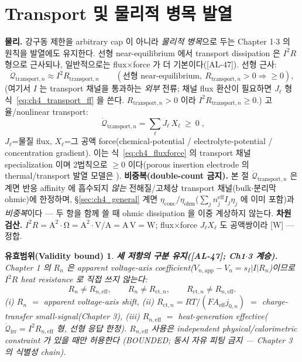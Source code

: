 \documentclass[11pt,a4paper]{article}
\newtheorem*{boundbox}{유효범위(Validity bound)}
\newcommand{\eff}{\mathrm{eff}}
\newcommand{\app}{\mathrm{app}}
\newcommand{\irr}{\mathrm{irr}}
\newcommand{\ct}{\mathrm{ct}}
\newcommand{\ohm}{\mathrm{ohm}}
\newcommand{\conc}{\mathrm{conc}}
\newcommand{\transp}{\mathrm{transport}}
\newcommand{\AL}[1]{\textsf{[AL-#1]}}
\begin{document}
\section{Transport 및 물리적 병목 발열}\label{sec:ch4_transport}
\textbf{물리.} 강구동 제한을 arbitrary cap 이 아니라 \emph{물리적 병목}으로 두는 Chapter 1$\cdot$3 의 원칙을
발열에도 유지한다. 선형 near-equilibrium 에서 transport dissipation 은 $I^2R$ 형으로 근사되나, 일반적으로는
flux$\times$force 가 더 기본이다(\AL{47}). 선형 근사:
\begin{equation}
\dot{\mathcal Q}_{\transp,n}\approx I^2 R_{\transp,n}\qquad(\text{선형 near-equilibrium},\ R_{\transp,n}>0\Rightarrow\ge0),
\label{eq:ch4_transport_i2r}
\end{equation}
(여기서 $I$ 는 transport 채널을 통과하는 \emph{외부} 전류; 채널 flux 환산이 필요하면 $J_\ell$ 형
식~\eqref{eq:ch4_transport_ff} 을 쓴다. $R_{\transp,n}>0$ 이라 $I^2R_{\transp,n}\ge0$.)
고율/nonlinear transport:
\begin{equation}
\boxed{\;\dot{\mathcal Q}_{\transp,n}=\sum_\ell J_\ell\,X_\ell\ \ge\ 0\;,}
\label{eq:ch4_transport_ff}
\end{equation}
$J_\ell$=물질 flux, $X_\ell$=그 공액 force(chemical-potential / electrolyte-potential / concentration
gradient). 이는 식~\eqref{eq:ch4_fluxforce} 의 transport 채널 specialization 이며 2법칙으로 $\ge0$ 이다(porous
insertion electrode 의 thermal/transport 발열 모델은 \cite{thomasnewman2003}).
\textbf{비중복(double-count 금지).} 본 절 $\dot{\mathcal Q}_{\transp,n}$ 은 계면 반응 affinity 에 흡수되지
\emph{않는} 전해질/고체상 transport 채널(bulk$\cdot$분리막 ohmic)에 한정하며, \S\ref{sec:ch4_general} 계면
$\eta_\conc/\eta_\ohm$($\sum_j n_j^{\eff}I_j\eta_j$ 에 이미 포함)과 \emph{비중복}이다 — 두 항을 함께 쓸 때 ohmic
dissipation 을 이중 계상하지 않는다.
\textbf{차원 검산.} $I^2R=\mathrm{A^2\cdot\Omega}=\mathrm{A^2\cdot V/A}=\mathrm{A\,V}=\mathrm W$; flux$\times$force
$J_\ell X_\ell$ 도 공액쌍이라 [W] — 정합.
\begin{boundbox}
\textbf{세 저항의 구분 유지(\AL{47}; Ch1$\cdot$3 계승).} Chapter 1 의 $R_n$ 은 apparent voltage-axis
coefficient($V_{n,\app}-V_n=s_I|I|R_n$)이므로 $I^2R$ heat resistance 로 \emph{직접} 쓰지 않는다:
\begin{equation}
R_n\ne R_{n,\eff},\qquad R_n\ne R_{\ct,n},\qquad R_{\ct,n}\ne R_{n,\eff}.
\label{eq:ch4_Rsep}
\end{equation}
(i) $R_n$ $=$ apparent voltage-axis shift, (ii) $R_{\ct,n}=RT/(FA_\eff j_{0,n})$ $=$ charge-transfer
small-signal(Chapter 3), (iii) $R_{n,\eff}$ $=$ heat-generation effective($\dot{\mathcal Q}_\irr=I^2R_{n,\eff}$
형, 선형 응답 한정). $R_{n,\eff}$ 사용은 independent physical/calorimetric constraint 가 있을 때만 허용한다
(BOUNDED; 동시 자유 피팅 금지 — Chapter 3 의 식별성 chain).
\end{boundbox}
\end{document}
